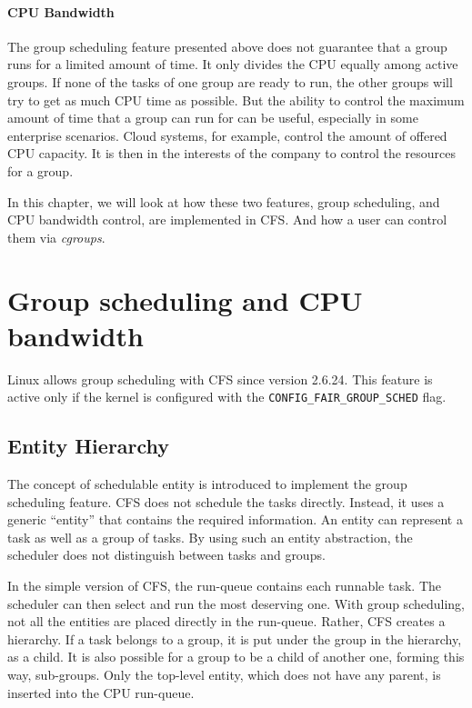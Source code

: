 \paragraph{CPU Bandwidth}
The group scheduling feature presented above does not guarantee that a group runs for a limited amount of time. It only divides the CPU equally among active groups. If none of the tasks of one group are ready to run, the other groups will try to get as much CPU time as possible. But the ability to control the maximum amount of time that a group can run for can be useful, especially in some enterprise scenarios.  Cloud systems, for example, control the amount of offered CPU capacity. It is then in the interests of the company to control the resources for a group.

In this chapter, we will look at how these two features, group scheduling, and CPU bandwidth control, are implemented in CFS. And how a user can control them via \textit{cgroups}.

\section{Group scheduling and CPU bandwidth}
\label{sec:group_and_cpu}

Linux allows group scheduling with CFS since version 2.6.24. This feature is active only if the kernel is configured with the \verb|CONFIG_FAIR_GROUP_SCHED| flag.

\subsection{Entity Hierarchy}

The concept of schedulable entity is introduced to implement the group scheduling feature. CFS does not schedule the tasks directly. Instead, it uses a generic ``entity'' that contains the required information. An entity can represent a task as well as a group of tasks. By using such an entity abstraction, the scheduler does not distinguish between tasks and groups.

In the simple version of CFS, the run-queue contains each runnable task. The scheduler can then select and run the most deserving one.
With group scheduling, not all the entities are placed directly in the run-queue. Rather, CFS creates a hierarchy. If a task belongs to a group, it is put under the group in the hierarchy, as a child. It is also possible for a group to be a child of another one, forming this way, sub-groups. Only the top-level entity, which does not have any parent, is inserted into the CPU run-queue.

